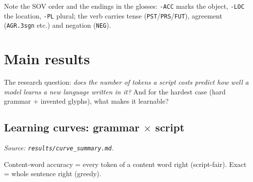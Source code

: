 \documentclass[10pt,a4paper,oneside]{article}
\begin{document}
Note the SOV order and the endings in the glosses: \texttt{-ACC} marks the object, \texttt{-LOC} the location,
\texttt{-PL} plural; the verb carries tense (\texttt{PST}/\texttt{PRS}/\texttt{FUT}), agreement (\texttt{AGR.3sgn}
etc.) and negation (\texttt{NEG}).

\section{Main results}

The research question: \emph{does the number of tokens a script costs predict how well a model learns a new
language written in it?} And for the hardest case (hard grammar + invented glyphs), what makes it learnable?

\subsection{Learning curves: grammar $\times$ script}
\textit{Source: \texttt{results/curve\_summary.md}.}


Content-word accuracy = every token of a content word right (script-fair). Exact = whole sentence right (greedy).
\end{document}
